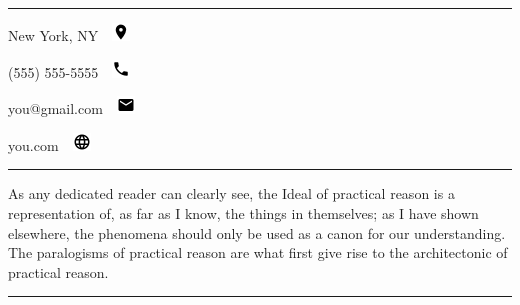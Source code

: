 \documentclass[11pt,oneside,a4paper]{article}
\begin{document}
\vspace*{0.50cm}
\hrule

\begin{minipage}[t]{0.23\textwidth}
    \vspace*{0.35cm}
    \begin{description}
        \item \hfill{New York, NY\,\,\,\, \includegraphics[scale=0.725]{contacts/location.png}\,\,}
        \item \hfill{(555) 555-5555\,\,\,\, \includegraphics[scale=0.725]{contacts/phone.png}\,\,}
        \item \hfill{you@gmail.com\,\,\,\, \includegraphics[scale=0.725]{contacts/email.png}\,\,}
        \item \hfill{you.com\,\,\,\, \includegraphics[scale=0.725]{contacts/site.png}\,\,}
    \end{description}
    \vspace*{0.15cm}
\end{minipage}
\hspace*{0.02\textwidth}
\rule[-122pt]{0.5pt}{122pt}
\hspace*{0.02\textwidth}
\begin{minipage}[t]{0.65\textwidth}
    \vspace*{0.80cm}
    As any dedicated reader can clearly see, the Ideal of practical reason is a representation of, as far as I know, the things in themselves; as I have shown elsewhere, the phenomena should only be used as a canon for our understanding. The paralogisms of practical reason are what first give rise to the architectonic of practical reason.
\end{minipage}

\hrule
\end{document}
